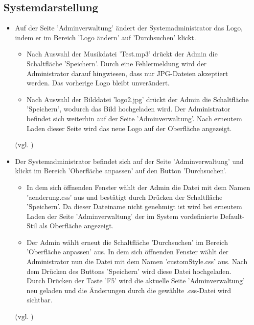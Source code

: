 \documentclass[a4paper]{scrreprt}
\begin{document}
		\subsection{Systemdarstellung}
			\begin{itemize}
				 \item {} 
				 Auf der Seite 'Adminverwaltung' ändert der Systemadministrator das Logo, indem er im Bereich 'Logo ändern' auf 'Durchsuchen' klickt.
					\begin{itemize}
						\item Nach Auswahl der Musikdatei 'Test.mp3' drückt der Admin die Schaltfläche 'Speichern'. Durch eine Fehlermeldung wird der Administrator darauf hingwiesen, dass nur JPG-Dateien akzeptiert werden. Das vorherige Logo bleibt unverändert.
						
					 	\item Nach Auswahl der Bilddatei 'logo2.jpg' drückt der Admin die Schaltfläche 'Speichern', wodurch das Bild hochgeladen wird. Der Administrator befindet sich weiterhin auf der Seite 'Adminverwaltung'. Nach erneutem Laden dieser Seite wird das neue Logo auf der Oberfläche angezeigt.
					\end{itemize}
				 (vgl. )	
				
				 \item {}
				 Der Systemadministrator befindet sich auf der Seite 'Adminverwaltung' und klickt im Bereich 'Oberfläche anpassen' auf den Button 'Durchsuchen'. 
					\begin{itemize}
						 \item In dem sich öffnenden Fenster wählt der Admin die Datei mit dem Namen 'aenderung.css' aus und bestätigt durch Drücken der Schaltfläche 'Speichern'. Da dieser Dateiname nicht genehmigt ist wird bei erneutem Laden der Seite 'Adminverwaltung' der im System vordefinierte Default-Stil als Oberfläche angezeigt.
						 
						 \item Der Admin wählt erneut die Schaltfläche 'Durchsuchen' im Bereich 'Oberfläche anpassen' aus. In dem sich öffnenden Fenster wählt der Administrator nun die Datei mit dem Namen 'customStyle.css' aus. Nach dem Drücken des Buttons 'Speichern' wird diese Datei hochgeladen. Durch Drücken der Taste 'F5' wird die aktuelle Seite 'Adminverwaltung' neu geladen und die Änderungen durch die gewählte .css-Datei wird sichtbar. 
					\end{itemize}
				 (vgl. )
				 
			\end{itemize}
			
\end{document}
